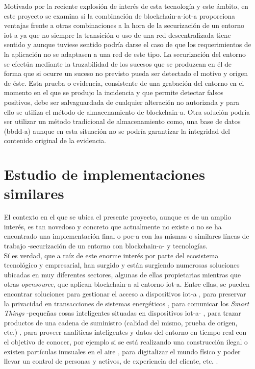 \documentclass[12pt,a4paper, twoside]{report}
\begin{document}
	Motivado por la reciente explosión de interés de esta tecnología y este ámbito, en este proyecto se examina si la combinación de \gls{blockchain-a}-\gls{iot-a} proporciona ventajas frente a otras combinaciones a la hora de la securización de un entorno \gls{iot-a} ya que no siempre la transición o uso de una red descentralizada tiene sentido y aunque tuviese sentido podría darse el caso de que los requerimientos de la aplicación no se adaptasen a una red de este tipo. La securización del entorno se efectúa mediante la trazabilidad de los sucesos que se produzcan en él de forma que si ocurre un suceso no previsto pueda ser detectado el motivo y origen de éste. Esta prueba o evidencia, consistente de una grabación del entorno en el momento en el que se produjo la incidencia y que permite detectar falsos positivos, debe ser salvaguardada de cualquier alteración no autorizada y para ello se utiliza el método de almacenamiento de \gls{blockchain-a}. Otra solución podría ser utilizar un método tradicional de almacenamiento como, una base de datos (\gls{bbdd-a}) aunque en esta situación no se podría garantizar la integridad del contenido original de la evidencia.
	
	\section{Estudio de implementaciones similares}
	
	El contexto en el que se ubica el presente proyecto, aunque es de un amplio interés, es tan novedoso y concreto que actualmente no existe o no se ha encontrado una implementación final o \gls{poc-a} con las mismas o similares líneas de trabajo -securización de un entorno con \gls{blockchain-a}- y tecnologías. \\
	
	Sí es verdad, que a raíz de este enorme interés por parte del ecosistema tecnológico y empresarial, han surgido y están surgiendo numerosas soluciones ubicadas en muy diferentes sectores, algunas de ellas propietarias mientras que otras \textit{\gls{opensource}}, que aplican \gls{blockchain-a} al entorno \gls{iot-a}. Entre ellas, se pueden encontrar soluciones para gestionar el acceso a dispositivos \gls{iot-a} \cite{blockchain:iot:novo}, para preservar la privacidad en transacciones de sistemas energéticos \cite{blockchain:iot:laszka}, para comunicar los \textit{Smart Things} -pequeñas cosas inteligentes situadas en dispositivos \gls{iot-a}- \cite{blockchain:iot:iost}, para trazar productos de una cadena de suministro (calidad del mismo, prueba de origen, etc.) \cite{blockchain:iot:ambrosus}, para proveer analíticas inteligentes y datos del entorno en tiempo real con el objetivo de conocer, por ejemplo si se está realizando una construcción ilegal o existen partículas inusuales en el aire \cite{blockchain:iot:nokia}, para digitalizar el mundo físico y poder llevar un control de personas y activos, de experiencia del cliente, etc. \cite{blockchain:iot:kontakt}.
	
\end{document}
